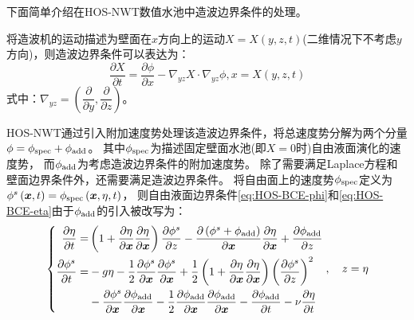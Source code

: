 下面简单介绍在HOS-NWT数值水池中造波边界条件的处理。

将造波机的运动描述为壁面在$x$方向上的运动$X = X\left(y,z,t\right)$(二维情况下不考虑$y$方向)，则造波边界条件可以表达为：
\begin{equation}
  \frac{\partial X}{\partial t} = \frac{\partial\phi}{\partial x} %
  - \nabla_{yz}X \cdot \nabla_{yz}\phi, x = X\left(y,z,t\right)
\end{equation}
式中：$\nabla_{yz} = \left(\dfrac{\partial}{\partial y}, \dfrac{\partial}{\partial z}\right)$。

HOS-NWT通过引入附加速度势处理该造波边界条件，将总速度势分解为两个分量$\phi = \phi_{\rm{spec}} + \phi_{\rm{add}}$。%
其中$\phi_{\rm{spec}}$为描述固定壁面水池(即$X = 0$时)自由液面演化的速度势，%
而$\phi_{\rm{add}}$为考虑造波边界条件的附加速度势。 %
除了需要满足Laplace方程和壁面边界条件外，还需要满足造波边界条件。%
将自由面上的速度势$\phi_{\rm{spec}}$定义为$\phi^s\left(\bm{x},t\right) = \phi_{\rm{spec}}\left(\bm{x},\eta,t\right)$，%
则自由液面边界条件\cref{eq:HOS-BCE-phi}和\cref{eq:HOS-BCE-eta}由于$\phi_{\rm{add}}$的引入被改写为：
\begin{equation}
  \left\{
    \begin{aligned}
    \frac{\partial\eta}{\partial t} =& %
    \left(1 + \frac{\partial\eta}{\partial \bm{x}}\frac{\partial\eta}{\partial \bm{x}}\right) %
    \frac{\partial\phi^s}{\partial z} %
    - \frac{\partial\left(\phi^s + \phi_{\rm{add}}\right)}{\partial\bm{x}} \frac{\partial\eta}{\partial\bm{x}} %
    + \frac{\partial\phi_{\rm{add}}}{\partial z} \\
    \frac{\partial\phi^s}{\partial t} =& - g\eta %
    - \frac{1}2 \frac{\partial\phi^s}{\partial\bm{x}} \frac{\partial\phi^s}{\partial\bm{x}} %
    + \frac{1}2\left(1 + \frac{\partial\eta}{\partial \bm{x}}\frac{\partial\eta}{\partial \bm{x}}\right) %
    \left(\frac{\partial\phi^s}{\partial z}\right)^2 \\
    &- \frac{\partial\phi^s}{\partial\bm{x}} \frac{\partial\phi_{\rm{add}}}{\partial\bm{x}} %
    - \frac{1}2 \frac{\partial\phi_{\rm{add}}}{\partial\bm{x}}\frac{\partial\phi_{\rm{add}}}{\partial\bm{x}} %
    - \frac{\partial\phi_{\rm{add}}}{\partial t} - \nu \frac{\partial\eta}{\partial t}
    \end{aligned}
  \right. %
  , \quad z = \eta
  \label{eq:HOS-NWT-FBC}
\end{equation}

